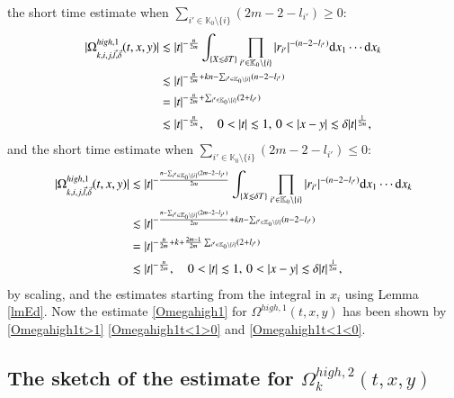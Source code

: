 \documentclass[11pt,reqno]{amsart}
\def\d{{\rm d}}
\numberwithin{equation}{section}
\theoremstyle{definition}
\begin{document}
the short time estimate when $\sum_{i'\in\mathbb{K}_0\setminus\{i\}}(2m-2-l_{i'})\geq0$:
\begin{equation}\label{Omegahigh1t<1>0}
	\begin{split}
		|\Omega_{k,i,j,\vec{l},\vec{\delta}}^{high,1}(t,x,y)|&\lesssim|t|^{-\frac{n}{2m}}\int_{\{X\lesssim\delta T\}}\prod\limits_{i'\in\mathbb{K}_0\setminus\{i\}}|r_{i'}|^{-(n-2-l_{i'})}\d x_1\cdots \d x_k\\
		&\lesssim|t|^{-\frac{n}{2m}+kn-\sum_{i'\in\mathbb{K}_0\setminus\{i\}}(n-2-l_{i'})}\\
	&=|t|^{-\frac{n}{2m}+\sum_{i'\in\mathbb{K}_0\setminus\{i\}}(2+l_{i'})}\\
&\lesssim|t|^{-\frac{n}{2m}},\quad0<|t|\lesssim1,\,0<|x-y|\lesssim\delta|t|^{\frac{1}{2m}},
	\end{split}
\end{equation}
and the short time estimate when $\sum_{i'\in\mathbb{K}_0\setminus\{i\}}(2m-2-l_{i'})\leq0$:
\begin{equation}\label{Omegahigh1t<1<0}
	\begin{split}
		|\Omega_{k,i,j,\vec{l},\vec{\delta}}^{high,1}(t,x,y)|&\lesssim|t|^{-\frac{n-\sum_{i'\in\mathbb{K}_0\setminus\{i\}}(2m-2-l_{i'})}{2m}}\int_{\{X\lesssim\delta T\}}\prod\limits_{i'\in\mathbb{K}_0\setminus\{i\}}|r_{i'}|^{-(n-2-l_{i'})}\d x_1\cdots \d x_k\\
		&\lesssim|t|^{-\frac{n-\sum_{i'\in\mathbb{K}_0\setminus\{i\}}(2m-2-l_{i'})}{2m}+kn-\sum_{i'\in\mathbb{K}_0\setminus\{i\}}(n-2-l_{i'})}\\
		&=|t|^{-\frac{n}{2m}+k+\frac{2m-1}{2m}\sum_{i'\in\mathbb{K}_0\setminus\{i\}}(2+l_{i'})}\\
		&\lesssim|t|^{-\frac{n}{2m}},\quad0<|t|\lesssim1,\,0<|x-y|\lesssim\delta|t|^{\frac{1}{2m}},
	\end{split}
\end{equation}
by scaling, and the estimates starting from the integral in $x_i$ using Lemma \ref{lmEd}. Now the estimate \eqref{Omegahigh1} for $\Omega^{high,1}(t,x,y)$ has been shown by \eqref{Omegahigh1t>1} \eqref{Omegahigh1t<1>0} and \eqref{Omegahigh1t<1<0}.


\subsection{The sketch of the estimate for $\Omega_k^{high,2}(t,x,y)$}\label{section4.3}\
\end{document}
